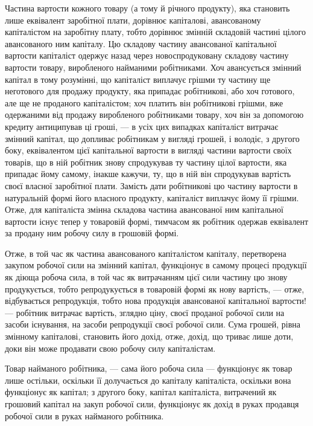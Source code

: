 Частина вартости кожного товару (а тому й річного продукту), яка становить лише еквівалент
заробітної плати, дорівнює капіталові, авансованому капіталістом на заробітну плату, тобто дорівнює
змінній складовій частині цілого авансованого ним капіталу. Цю складову частину авансованої
капітальної вартости капіталіст одержує назад через новоспродуковану складову частину вартости
товару, виробленого найманими робітниками. Хоч авансується змінний капітал в тому розумінні, що
капіталіст виплачує грішми ту частину ще неготового для продажу продукту, яка припадає робітникові,
або хоч готового, але ще не проданого капіталістом; хоч платить він робітникові грішми, вже
одержаними від продажу виробленого робітниками товару, хоч він за допомогою кредиту антиципував
ці гроші, — в усіх цих випадках капіталіст витрачає змінний капітал, що допливає робітникам
у вигляді грошей, і володіє, з другого боку, еквівалентом цієї капітальної вартости в вигляді
частини вартости своїх товарів, що в ній робітник знову спродукував ту частину цілої вартости, яка
припадає йому самому, інакше кажучи, ту, що в ній він спродукував вартість своєї власної заробітної
плати. Замість дати робітникові цю частину вартости в натуральній формі його власного продукту,
капіталіст виплачує йому її грішми. Отже, для капіталіста змінна складова частина
авансованої ним капітальної вартости існує тепер у товаровій формі, тимчасом як робітник одержав
еквівалент за продану ним робочу силу в грошовій формі.

Отже, в той час як частина авансованого капіталістом капіталу, перетворена закупом робочої сили на
змінний капітал, функціонує в самому процесі продукції як діюща робоча сила, в той час як
витрачанням цієї сили частину цю знову продукується, тобто репродукується в товаровій формі як нову
вартість, — отже, відбувається репродукція, тобто нова продукція авансованої капітальної вартости! —
робітник витрачає вартість,
зглядно ціну, своєї проданої робочої сили на засоби існування, на засоби репродукції своєї робочої
сили. Сума грошей, рівна змінному капіталові, становить його дохід, отже, дохід, що триває лише
доти, доки він може продавати свою робочу силу капіталістам.

Товар найманого робітника, — сама його робоча сила — функціонує як товар лише остільки, оскільки її
долучається до капіталу капіталіста, оскільки вона функціонує як капітал; з другого боку, капітал
капіталіста, витрачений як грошовий капітал на закуп робочої сили, функціонує як дохід в руках
продавця робочої сили в руках найманого робітника.

